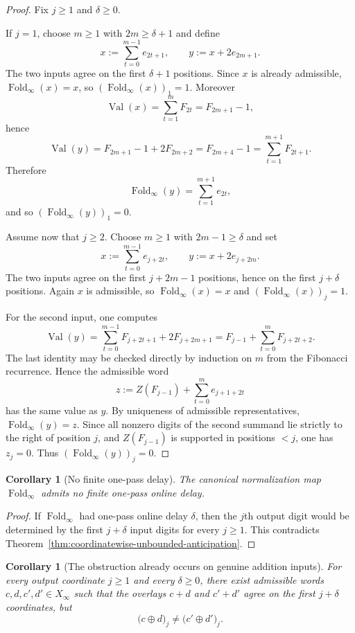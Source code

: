 \documentclass[11pt,letterpaper]{article}
\numberwithin{equation}{section}
\theoremstyle{plain}
\newtheorem{corollary}[theorem]{Corollary}
\theoremstyle{definition}
\theoremstyle{remark}
\newcommand{\Xinf}{X_\infty}
\DeclareMathOperator{\Val}{Val}
\DeclareMathOperator{\Fold}{Fold}
\begin{document}
\begin{proof}
Fix $j\ge 1$ and $\delta\ge 0$.

If $j=1$, choose $m\ge 1$ with $2m\ge \delta+1$ and define
\[
x:=\sum_{t=0}^{m-1} e_{2t+1},
\qquad
y:=x+2e_{2m+1}.
\]
The two inputs agree on the first $\delta+1$ positions.  Since $x$ is already
admissible, $\Fold_\infty(x)=x$, so $(\Fold_\infty(x))_1=1$.  Moreover
\[
\Val(x)=\sum_{t=1}^{m}F_{2t}=F_{2m+1}-1,
\]
hence
\[
\Val(y)=F_{2m+1}-1+2F_{2m+2}=F_{2m+4}-1=\sum_{t=1}^{m+1}F_{2t+1}.
\]
Therefore
\[
\Fold_\infty(y)=\sum_{t=1}^{m+1} e_{2t},
\]
and so $(\Fold_\infty(y))_1=0$.

Assume now that $j\ge 2$.  Choose $m\ge 1$ with $2m-1\ge \delta$ and set
\[
x:=\sum_{t=0}^{m-1} e_{j+2t},
\qquad
y:=x+2e_{j+2m}.
\]
The two inputs agree on the first $j+2m-1$ positions, hence on the first
$j+\delta$ positions.  Again $x$ is admissible, so $\Fold_\infty(x)=x$ and
$(\Fold_\infty(x))_j=1$.

For the second input, one computes
\[
\Val(y)
=
\sum_{t=0}^{m-1}F_{j+2t+1}+2F_{j+2m+1}
=
F_{j-1}+\sum_{t=0}^{m}F_{j+2t+2}.
\]
The last identity may be checked directly by induction on $m$ from the
Fibonacci recurrence.
Hence the admissible word
\[
z:=Z(F_{j-1})+\sum_{t=0}^{m} e_{j+1+2t}
\]
has the same value as $y$.  By uniqueness of admissible representatives,
$\Fold_\infty(y)=z$.  Since all nonzero digits of the second summand lie
strictly to the right of position $j$, and $Z(F_{j-1})$ is supported in
positions $<j$, one has $z_j=0$.  Thus $(\Fold_\infty(y))_j=0$.
\end{proof}

\begin{corollary}[No finite one-pass delay]\label{thm:no-bounded-delay}
The canonical normalization map $\Fold_\infty$ admits no finite one-pass
online delay.
\end{corollary}

\begin{proof}
If $\Fold_\infty$ had one-pass online delay $\delta$, then the $j$th output
digit would be determined by the first $j+\delta$ input digits for every
$j\ge 1$.  This contradicts
Theorem~\ref{thm:coordinatewise-unbounded-anticipation}.
\end{proof}

\begin{corollary}[The obstruction already occurs on genuine addition inputs]\label{cor:addition-image-unbounded-anticipation}
For every output coordinate $j\ge 1$ and every $\delta\ge 0$, there exist
admissible words $c,d,c',d'\in \Xinf$ such that the overlays $c+d$ and
$c'+d'$ agree on the first $j+\delta$ coordinates, but
\[
\bigl(c\oplus d\bigr)_j \neq \bigl(c'\oplus d'\bigr)_j.
\]
\end{corollary}
\end{document}
